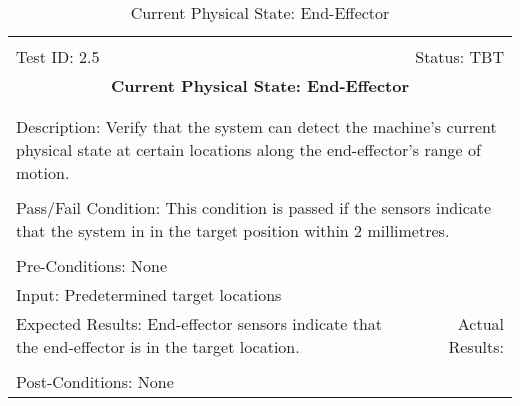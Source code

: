 \documentclass[titlepage]{article}
\begin{document}
\begin{center}%
\begin{table}[h!]
\begin{tabular}{|l r|}\hline&\\[-2mm]
	Test ID: 2.5	&Status: TBT\\[-3mm]
	\multicolumn{2}{|c|}{\textbf{\large{Current Physical State: End-Effector}}}\\&\\\hline&\\[-3mm]
	\multicolumn{2}{|p{\textwidth}|}{Description: Verify that the system can detect the machine's current physical state at certain locations along the end-effector's range of motion.}\\[1mm]\hline&\\[-3mm]
	\multicolumn{2}{|p{\textwidth}|}{Pass/Fail Condition: This condition is passed if the sensors indicate that the system in in the target position within 2 millimetres.}\\[1mm]\hline&\\[-3mm]
	\multicolumn{2}{|p{\textwidth}|}{Pre-Conditions: None}\\[4mm]
	\multicolumn{2}{|p{\textwidth}|}{Input: Predetermined target locations}\\[2mm]\hline
	\multicolumn{1}{|p{0.49\textwidth}}{Expected Results: End-effector sensors indicate that the end-effector is in the target location.}	&\multicolumn{1}{|p{0.45\textwidth}|}{Actual Results:}\\\hline&\\[-3mm]
	\multicolumn{2}{|p{\textwidth}|}{Post-Conditions: None}\\\hline
\end{tabular}
\caption{Current Physical State: End-Effector}
\end{table}
\end{center}
\newpage
\end{document}
